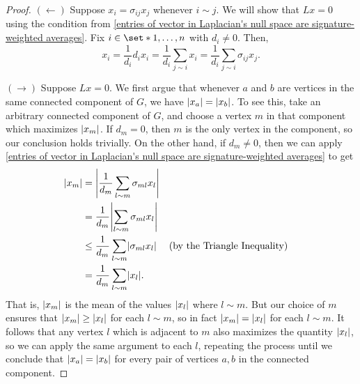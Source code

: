 \documentclass[12pt]{article}
\theoremstyle{definition}
\DeclarePairedDelimiter\abs{\lvert}{\rvert}
\begin{document}
\begin{proof}
$(\leftarrow)$ Suppose $x_i = \sigma_{ij}x_j$ whenever $i \sim j$. We will show that $Lx = 0$ using the condition from \cref{entries of vector in Laplacian's null space are signature-weighted averages}. Fix $i \in \set*{1, \dots, n}$ with $d_i \neq 0$. Then,
$$
x_i 
= \frac{1}{d_i} d_i x_i
= \frac{1}{d_i} \sum_{j \sim i} x_i
= \frac{1}{d_i} \sum_{j \sim i} \sigma_{ij}x_j.
$$ 

$(\rightarrow)$ Suppose $Lx = 0$. We first argue that whenever $a$ and $b$ are vertices in the same connected component of $G$, we have $\abs*{x_a} = \abs*{x_b}$. To see this, take an arbitrary connected component of $G$, and choose a vertex $m$ in that component which maximizes $\abs*{x_m}$. If $d_m = 0$, then $m$ is the only vertex in the component, so our conclusion holds trivially. On the other hand, if $d_m \neq 0$, then we can apply \cref{entries of vector in Laplacian's null space are signature-weighted averages} to get
\begin{align*}
\abs*{x_m} &= \abs*{\frac{1}{d_m} \sum_{l \sim m} \sigma_{ml} x_l} \\
&= \frac{1}{d_m} \abs*{\sum_{l \sim m} \sigma_{ml} x_l} \\
&\leq \frac{1}{d_m} \sum_{l \sim m} \abs*{\sigma_{ml} x_l} && \text{(by the Triangle Inequality)} \\
&= \frac{1}{d_m} \sum_{l \sim m} \abs*{x_l}.
\end{align*}
That is, $\abs*{x_m}$ is the mean of the values $\abs{x_l}$ where $l \sim m$. But our choice of $m$ ensures that $\abs*{x_m} \geq \abs*{x_l}$ for each $l \sim m$, so in fact $\abs*{x_m} = \abs*{x_l}$ for each $l \sim m$. It follows that any vertex $l$ which is adjacent to $m$ also maximizes the quantity $\abs*{x_l}$, so we can apply the same argument to each $l$, repeating the process until we conclude that $\abs*{x_a} = \abs*{x_b}$ for every pair of vertices $a, b$ in the connected component.


\end{proof}
\end{document}
